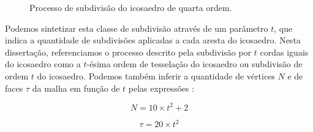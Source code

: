 \documentclass[
    12pt,                %
    oneside,            %
    a4paper,            %
    english,            %
    french,                %
    spanish,            %
    brazil                %
    ]{abntex2}
\begin{document}
\begin{figure}[H]
\centering
\captionsetup[subfloat]{farskip=0pt,nearskip=0pt}
\centering
    \hspace{1em}
     \caption{Processo de subdivisão do icosaedro de quarta ordem.}
    \label{fig::icosaedro_subdivisao_4}
\end{figure}

Podemos sintetizar esta classe de subdivisão através de um parâmetro $t$, que indica a quantidade de subdivisões aplicadas a cada aresta do icosaedro. Nesta dissertação, referenciamos o processo descrito pela subdivisão por $t$ cordas iguais do icosaedro como a \textsf{$t$-ésima ordem de tesselação do icosaedro} ou \textsf{subdivisão de ordem $t$ do icosaedro}. Podemos também inferir a quantidade de vértices $N$ e de faces $\tau$ da malha em função de $t$ pelas expressões \cite{popko2012}:

\begin{equation}
\label{eq::icosphere_vertices}
    N = 10\times t^2 + 2
\end{equation}

\begin{equation}
\label{eq::icosphere_triangulos}
\tau = 20\times t^2
\end{equation}
\end{document}
